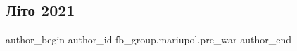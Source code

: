  
 
 
 
 

\subsection{Літо 2021}
\label{sec:26_02_2023.fb.fb_group.mariupol.pre_war.2.l_to_2021}

\ifcmt
 author_begin
   author_id fb_group.mariupol.pre_war
 author_end
\fi

